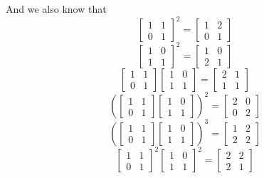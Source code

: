 \documentclass{article}
\begin{document}
    And we also know that
    \[ \begin{bmatrix} 1 & 1 \\
        0 & 1 \end{bmatrix}^2
        = \begin{bmatrix} 1 & 2 \\
        0 & 1 \end{bmatrix}  \]
    \[ \begin{bmatrix} 1 & 0 \\
        1 & 1 \end{bmatrix}^2
        = \begin{bmatrix} 1 & 0 \\
        2 & 1 \end{bmatrix}  \]
    \[ \begin{bmatrix} 1 & 1 \\
        0 & 1 \end{bmatrix}
        \begin{bmatrix} 1 & 0 \\
            1 & 1 \end{bmatrix}
        = \begin{bmatrix} 2 & 1 \\
        1 & 1 \end{bmatrix}  \]
    \[ \left(\begin{bmatrix} 1 & 1 \\
        0 & 1 \end{bmatrix}
        \begin{bmatrix} 1 & 0 \\
            1 & 1 \end{bmatrix} \right)^2
        = \begin{bmatrix} 2 & 0 \\
        0 & 2 \end{bmatrix}  \]
    \[ \left(\begin{bmatrix} 1 & 1 \\
        0 & 1 \end{bmatrix}
        \begin{bmatrix} 1 & 0 \\
            1 & 1 \end{bmatrix} \right)^3
        = \begin{bmatrix} 1 & 2 \\
        2 & 2 \end{bmatrix}  \]
    \[ \begin{bmatrix} 1 & 1 \\
        0 & 1 \end{bmatrix}^2
        \begin{bmatrix} 1 & 0 \\
            1 & 1 \end{bmatrix}^2
        = \begin{bmatrix} 2 & 2 \\
        2 & 1 \end{bmatrix}  \]
\end{document}
